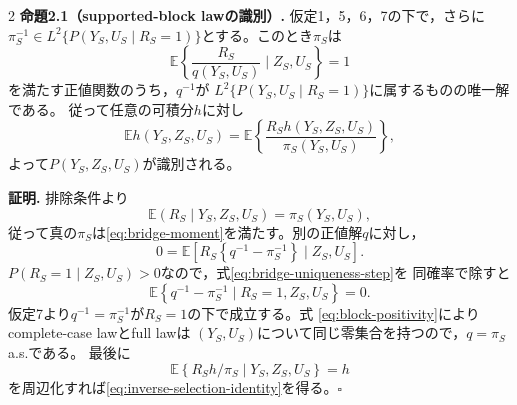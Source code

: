 \documentclass[a4paper,10pt]{article}
\newcommand{\E}{\mathbb E}
\begin{document}
\begin{multicols}{2}
\noindent\textbf{命題2.1（supported-block lawの識別）.}
仮定1，5，6，7の下で，さらに
$\pi_S^{-1}\in L^2\{P(Y_S,U_S\mid R_S=1)\}$とする。このとき$\pi_S$は
\begin{equation}
\E\left\{\frac{R_S}{q(Y_S,U_S)}\mid Z_S,U_S\right\}=1
\label{eq:bridge-moment}
\end{equation}
を満たす正値関数のうち，$q^{-1}$が
$L^2\{P(Y_S,U_S\mid R_S=1)\}$に属するものの唯一解である。
従って任意の可積分$h$に対し
\begin{equation}
\E h(Y_S,Z_S,U_S)
=\E\left\{\frac{R_Sh(Y_S,Z_S,U_S)}{\pi_S(Y_S,U_S)}\right\},
\label{eq:inverse-selection-identity}
\end{equation}
よって$P(Y_S,Z_S,U_S)$が識別される。

\noindent\textbf{証明.}
排除条件より
\begin{equation}
\E(R_S\mid Y_S,Z_S,U_S)=\pi_S(Y_S,U_S),
\label{eq:selection-expectation}
\end{equation}
従って真の$\pi_S$は\eqref{eq:bridge-moment}を満たす。別の正値解$q$に対し，
\begin{equation}
0=\E\left[R_S\left\{q^{-1}-\pi_S^{-1}\right\}\mid Z_S,U_S\right].
\label{eq:bridge-uniqueness-step}
\end{equation}
$P(R_S=1\mid Z_S,U_S)>0$なので，式\eqref{eq:bridge-uniqueness-step}を
同確率で除すと
\begin{equation}
\E\left\{q^{-1}-\pi_S^{-1}\mid R_S=1,Z_S,U_S\right\}=0.
\label{eq:complete-case-bridge-uniqueness}
\end{equation}
仮定7より$q^{-1}=\pi_S^{-1}$が$R_S=1$の下で成立する。式
\eqref{eq:block-positivity}によりcomplete-case lawとfull lawは
$(Y_S,U_S)$について同じ零集合を持つので，$q=\pi_S$ a.s.である。
最後に
\begin{equation}
\E\left\{R_Sh/\pi_S\mid Y_S,Z_S,U_S\right\}=h
\label{eq:ipw-conditional-identity}
\end{equation}
を周辺化すれば\eqref{eq:inverse-selection-identity}を得る。\hfill$\square$

\begin{center}
\begin{minipage}{\linewidth}
\centering

\label{fig:identification-flow}
\end{minipage}
\end{center}


\end{multicols}
\end{document}
